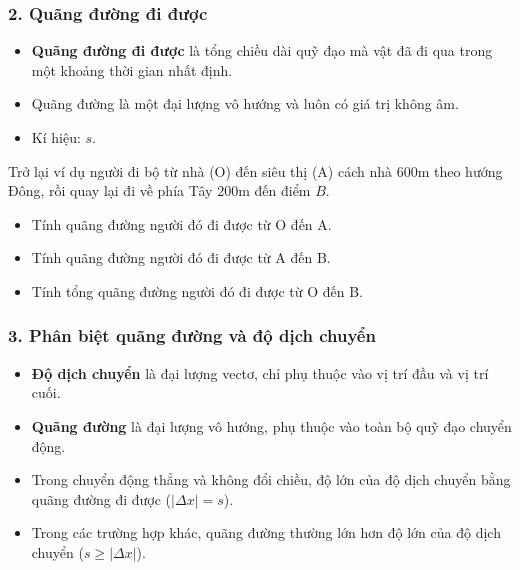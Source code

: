 \subsubsection{2. Quãng đường đi được}

\begin{kienthuc}
\begin{itemize}
    \item \textbf{Quãng đường đi được} là tổng chiều dài quỹ đạo mà vật đã đi qua trong một khoảng thời gian nhất định.
    \item Quãng đường là một đại lượng vô hướng và luôn có giá trị không âm.
    \item Kí hiệu: $s$.
\end{itemize}
\end{kienthuc}

\begin{hoatdong}
Trở lại ví dụ người đi bộ từ nhà (O) đến siêu thị (A) cách nhà $600 \text{m}$ theo hướng Đông, rồi quay lại đi về phía Tây $200 \text{m}$ đến điểm $B$.
\begin{itemize}
    \item Tính quãng đường người đó đi được từ O đến A.
    \item Tính quãng đường người đó đi được từ A đến B.
    \item Tính tổng quãng đường người đó đi được từ O đến B.
\end{itemize}
\end{hoatdong}

\subsubsection{3. Phân biệt quãng đường và độ dịch chuyển}

\begin{kienthuc}
\begin{itemize}
    \item \textbf{Độ dịch chuyển} là đại lượng vectơ, chỉ phụ thuộc vào vị trí đầu và vị trí cuối.
    \item \textbf{Quãng đường} là đại lượng vô hướng, phụ thuộc vào toàn bộ quỹ đạo chuyển động.
    \item Trong chuyển động thẳng và không đổi chiều, độ lớn của độ dịch chuyển bằng quãng đường đi được ($|\Delta x| = s$).
    \item Trong các trường hợp khác, quãng đường thường lớn hơn độ lớn của độ dịch chuyển ($s \ge |\Delta x|$).
\end{itemize}
\end{kienthuc}

